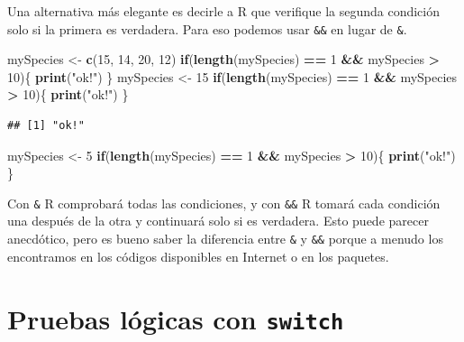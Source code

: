 \documentclass[
]{book}
\newenvironment{Shaded}{\begin{snugshade}}{\end{snugshade}}
\newcommand{\ControlFlowTok}[1]{\textcolor[rgb]{0.13,0.29,0.53}{\textbf{#1}}}
\newcommand{\DecValTok}[1]{\textcolor[rgb]{0.00,0.00,0.81}{#1}}
\newcommand{\KeywordTok}[1]{\textcolor[rgb]{0.13,0.29,0.53}{\textbf{#1}}}
\newcommand{\NormalTok}[1]{#1}
\newcommand{\OperatorTok}[1]{\textcolor[rgb]{0.81,0.36,0.00}{\textbf{#1}}}
\newcommand{\StringTok}[1]{\textcolor[rgb]{0.31,0.60,0.02}{#1}}
\begin{document}
Una alternativa más elegante es decirle a R que verifique la segunda condición solo si la primera es verdadera. Para eso podemos usar \texttt{\&\&} en lugar de \texttt{\&}.

\begin{Shaded}
\begin{Highlighting}[]
\NormalTok{mySpecies <-}\StringTok{ }\KeywordTok{c}\NormalTok{(}\DecValTok{15}\NormalTok{, }\DecValTok{14}\NormalTok{, }\DecValTok{20}\NormalTok{, }\DecValTok{12}\NormalTok{)}
\ControlFlowTok{if}\NormalTok{(}\KeywordTok{length}\NormalTok{(mySpecies) }\OperatorTok{==}\StringTok{ }\DecValTok{1} \OperatorTok{&&}\StringTok{ }\NormalTok{mySpecies }\OperatorTok{>}\StringTok{ }\DecValTok{10}\NormalTok{)\{}
  \KeywordTok{print}\NormalTok{(}\StringTok{"ok!"}\NormalTok{)}
\NormalTok{\}}
\NormalTok{mySpecies <-}\StringTok{ }\DecValTok{15}
\ControlFlowTok{if}\NormalTok{(}\KeywordTok{length}\NormalTok{(mySpecies) }\OperatorTok{==}\StringTok{ }\DecValTok{1} \OperatorTok{&&}\StringTok{ }\NormalTok{mySpecies }\OperatorTok{>}\StringTok{ }\DecValTok{10}\NormalTok{)\{}
  \KeywordTok{print}\NormalTok{(}\StringTok{"ok!"}\NormalTok{)}
\NormalTok{\}}
\end{Highlighting}
\end{Shaded}

\begin{verbatim}
## [1] "ok!"
\end{verbatim}

\begin{Shaded}
\begin{Highlighting}[]
\NormalTok{mySpecies <-}\StringTok{ }\DecValTok{5}
\ControlFlowTok{if}\NormalTok{(}\KeywordTok{length}\NormalTok{(mySpecies) }\OperatorTok{==}\StringTok{ }\DecValTok{1} \OperatorTok{&&}\StringTok{ }\NormalTok{mySpecies }\OperatorTok{>}\StringTok{ }\DecValTok{10}\NormalTok{)\{}
  \KeywordTok{print}\NormalTok{(}\StringTok{"ok!"}\NormalTok{)}
\NormalTok{\}}
\end{Highlighting}
\end{Shaded}

Con \texttt{\&} R comprobará todas las condiciones, y con \texttt{\&\&} R tomará cada condición una después de la otra y continuará solo si es verdadera. Esto puede parecer anecdótico, pero es bueno saber la diferencia entre \texttt{\&} y \texttt{\&\&} porque a menudo los encontramos en los códigos disponibles en Internet o en los paquetes.

\hypertarget{l17switch}{%
\section{\texorpdfstring{Pruebas lógicas con \texttt{switch}}{Pruebas lógicas con switch}}\label{l17switch}}
\end{document}
